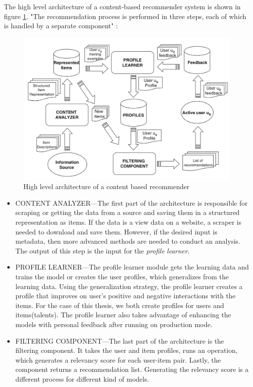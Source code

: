 The high level architecture of a content-based recommender system is shown in figure \ref{fig:high-level-content-based}. "The recommendation process is performed in three steps, each of which is handled by a separate component" \cite{de2015semantics}:

\begin{figure}[htp]
	\centering
	\includegraphics[width=\textwidth]{figures/HighLevelContentBased.png}
	\caption{High level architecture of a content based recommender  ~\parencite{de2015semantics}}
	\label{fig:high-level-content-based}
\end{figure}



\begin{itemize}
	\item CONTENT ANALYZER—The first part of the architecture is responsible for scraping or getting the data from a source and saving them in a structured representation as items. If the data is a view data on a website, a scraper is needed to download and save them. However, if the desired input is metadata, then more advanced methods are needed to conduct an analysis. The output of this step is the input for the \textit{profile learner}.
	\item PROFILE LEARNER—The profile learner module gets the learning data and trains the model or creates the user profiles, which generalizes from the learning data. Using the generalization strategy, the profile learner creates a profile that improves on user's positive and negative interactions with the items. For the case of this thesis, we both create profiles for users and items(talents). The profile learner also takes advantage of enhancing the models with personal feedback after running on production mode.
	\item FILTERING COMPONENT—The last part of the architecture is the filtering component. It takes the user and item profiles, runs an operation, which generates a relevancy score for each user-item pair. Lastly, the component returns a recommendation list. Generating the relevancy score is a different process for different kind of models.
\end{itemize}

